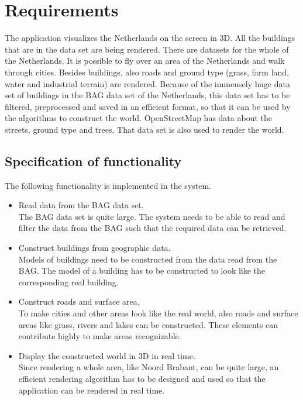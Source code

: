 \chapter{Requirements}
\label{chap:Requirements}
The application visualizes the Netherlands on the screen in 3D. All the buildings that are in the data set are being rendered. There are datasets for the whole of the Netherlands. It is possible to fly over an area of the Netherlands and walk through cities. Besides buildings, also roads and ground type (grass, farm land, water and industrial terrain) are rendered.
Because of the immensely huge data set of buildings in the BAG data set of the Netherlands, this data set has to be filtered, preprocessed and saved in an efficient format, so that it can be used by the algorithms to construct the world. OpenStreetMap has data about the streets, ground type and trees. That data set is also used to render the world.

\section{Specification of functionality}
\label{sec:SpecificationOfFunctionality}
The following functionality is implemented in the system.
\begin{itemize}
  \item Read data from the BAG data set.\\
    The BAG data set is quite large. The system needs to be able to read and filter the data from the BAG such that the required data can be retrieved.
  \item Construct buildings from geographic data. \\
    Models of buildings need to be constructed from the data read from the BAG. The model of a building has to be constructed to look like the corresponding real building.
  \item Construct roads and surface area.\\
    To make cities and other areas look like the real world, also roads and surface areas like grass, rivers and lakes can be constructed. These elements can contribute highly to make areas recognizable.
  \item Display the constructed world in 3D in real time.\\
    Since rendering a whole area, like Noord Brabant, can be quite large, an efficient rendering algorithm has to be designed and used so that the application can be rendered in real time.
\end{itemize}
